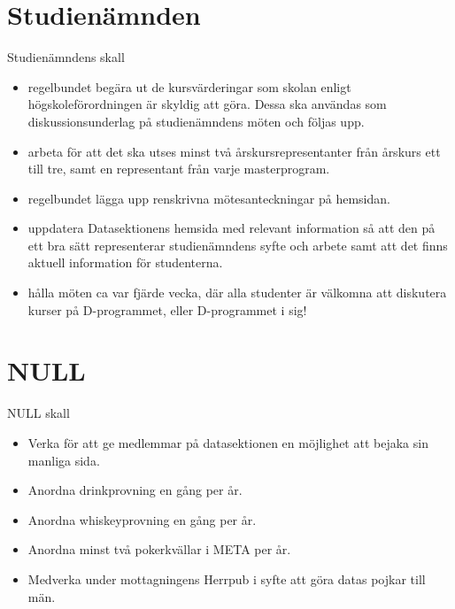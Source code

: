 \documentclass{dgovdoc}
\begin{document}
\section{Studienämnden}

Studienämndens skall

\begin{itemize}
\item regelbundet begära ut de kursvärderingar som skolan enligt
  högskoleförordningen är skyldig att göra. Dessa ska användas som
  diskussionsunderlag på studienämndens möten och följas upp.
\item arbeta för att det ska utses minst två årskursrepresentanter från årskurs
  ett till tre, samt en representant från varje masterprogram.
\item regelbundet lägga upp renskrivna mötesanteckningar på hemsidan.
\item uppdatera Datasektionens hemsida med relevant information så att den på
  ett bra sätt representerar studienämndens syfte och arbete samt att det finns
  aktuell information för studenterna.
\item hålla möten ca var fjärde vecka, där alla studenter är välkomna att
  diskutera kurser på D-programmet, eller D-programmet i sig!
\end{itemize}

\section{NULL}

NULL skall

\begin{itemize}
\item Verka för att ge medlemmar på datasektionen en möjlighet att bejaka sin
    manliga sida.
\item Anordna drinkprovning en gång per år.
\item Anordna whiskeyprovning en gång per år.
\item Anordna minst två pokerkvällar i META per år.
\item Medverka under mottagningens Herrpub i syfte att göra datas pojkar till
    män.
\end{itemize}
\end{document}
